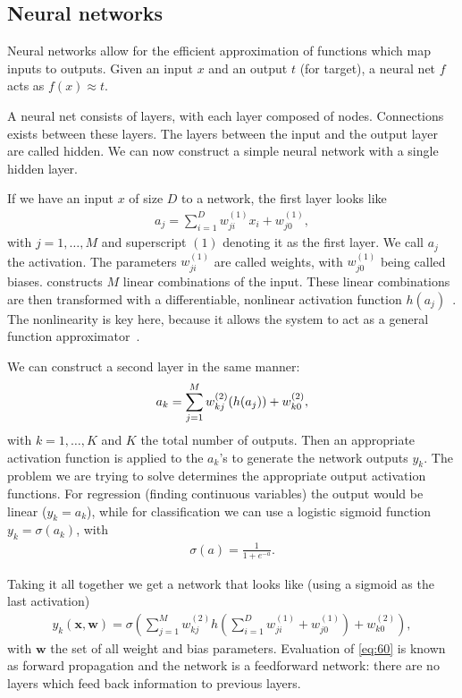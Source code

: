 \documentclass[11pt, a4paper]{report} %
\begin{document}
\subsection{Neural networks}\label{sec:neural-networks}
Neural networks allow for the efficient approximation of functions which map inputs to outputs.
Given an input \(x\) and an output \(t\) (for target), a neural net \(f\) acts as \(f(x)\approx t\).

A neural net consists of layers, with each layer composed of nodes.
Connections exists between these layers.
The layers between the input and the output layer are called hidden.
We can now construct a simple neural network with a single hidden layer.

If we have an input \(x\) of size \(D\) to a network, the first layer looks like
\begin{align}
  \label{eq:57}
  a_j = \sum_{i=1}^D w_{ji}^{(1)}x_i + w_{j0}^{(1)},
\end{align}
with \(j=1,\ldots,M\) and superscript \((1)\) denoting it as the first layer.
We call \(a_j\) the activation.
The parameters \(w_{ji}^{(1)}\) are called weights, with \(w_{j0}^{(1)}\) being called biases.
 constructs \(M\) linear combinations of the input.
These linear combinations are then transformed with a differentiable, nonlinear activation function \(h(a_j)\)~\cite{Bishop2006}.
The nonlinearity is key here, because it allows the system to act as a general function approximator~\cite{Sutton}.

We can construct a second layer in the same manner:
\begin{align}
  \label{eq:58}
  a_k = \sum_{j=1}^M w_{kj}^{(2)}\qty(h(a_j)) + w_{k0}^{(2)},
\end{align}
with \(k=1,\ldots,K\) and \(K\) the total number of outputs.
Then an appropriate activation function is applied to the \(a_k\)'s to generate the network outputs \(y_k\).
The problem we are trying to solve determines the appropriate output activation functions.
For regression (finding continuous variables) the output would be linear (\(y_k=a_k\)), while for classification we can use a logistic sigmoid function \(y_k=\sigma(a_k)\), with
\begin{align}
  \label{eq:59}
  \sigma (a) = \frac{1}{1+e^{-a}}.
\end{align}

Taking it all together we get a network that looks like (using a sigmoid as the last activation)
\begin{align}
  \label{eq:60}
  y_k(\mathbf{x},\mathbf{w}) = \sigma\left(\sum_{j=1}^M w_{kj}^{(2)}h\left(\sum_{i=1}^D w_{ji}^{(1)}+w_{j0}^{(1)}\right)+w_{k0}^{(2)}\right),
\end{align}
with \(\mathbf{w}\) the set of all weight and bias parameters.
Evaluation of \cref{eq:60} is known as forward propagation and the network is a feedforward network: there are no layers which feed back information to previous layers.
\end{document}
